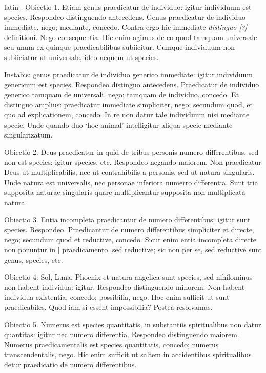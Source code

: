 \begin{otherlanguage*}{latin}
\pstart
\textnormal{|} Obiectio 1. Etiam genus praedicatur de individuo:
igitur individuum est species. Respondeo distinguendo antecedens. Genus praedicatur de individuo immediate, nego; mediante, concedo. Contra ergo hic immediate \emph{distinguo [?]} definitioni. Nego consequentia. Hic enim agimus de eo quod tamquam universale seu unum ex quinque praedicabilibus subiicitur. Cumque individuum non subiiciatur ut universale, ideo nequem ut species. 
\pend

\pstart
Instabis:
genus praedicatur de individuo generico immediate:
igitur individuum genericum est species. Respondeo distinguo antecedens. Praedicatur de individuo generico tamquam de universali, nego; tamquam de individuo, concedo. Et distinguo amplius:
praedicatur immediate simpliciter, nego; secundum quod, et quo ad explicationem, concedo. In re non datur tale individuum nisi mediante specie. Unde quando duo `hoc animal' intelligitur aliqua specie mediante singularizatum. 
\pend

\pstart
Obiectio 2. Deus praedicatur in quid de tribus personis numero differentibus, sed non est species:
igitur species, etc. Respondeo negando maiorem. Non praedicatur Deus ut multiplicabilis, nec ut contrahibilis a personis, sed ut natura singularis. Unde natura est universalis, nec personae inferiora numerro differentia. Sunt tria supposita naturae singularis quare multiplicantur supposita non multiplicata natura. 
\pend

\pstart
Obiectio 3. Entia incompleta praedicantur de numero differentibus:
igitur sunt species. Respondeo. Praedicantur de numero differentibus simpliciter et directe, nego; secundum quod et reductive, concedo. Sicut enim entia incompleta directe non ponuntur in \textnormal{|} praedicamento, sed reductive; sic non per se, sed reductive sunt genus, species, etc. 
\pend

\pstart
Obiectio 4:
Sol, Luna, Phoenix et natura angelica sunt species, sed nihilominus non habent individua:
igitur. Respondeo distinguendo minorem. Non habent individua existentia, concedo; possibilia, nego. Hoc enim sufficit ut sunt praedicabiles. Quod iam si essent impossibilia? Postea resolvamus. 
\pend

\pstart
Obiectio 5. Numerus est species quantitatis, in substantiis spiritualibus non datur quantitas:
igitur nec numero differentia. Respondeo distinguendo maiorem. Numerus praedicamentalis est species quantitatis, concedo; numerus transcendentalis, nego. Hic enim sufficit ut saltem in accidentibus spiritualibus detur praedicatio de numero differentibus. 
\pend


\end{otherlanguage*}
